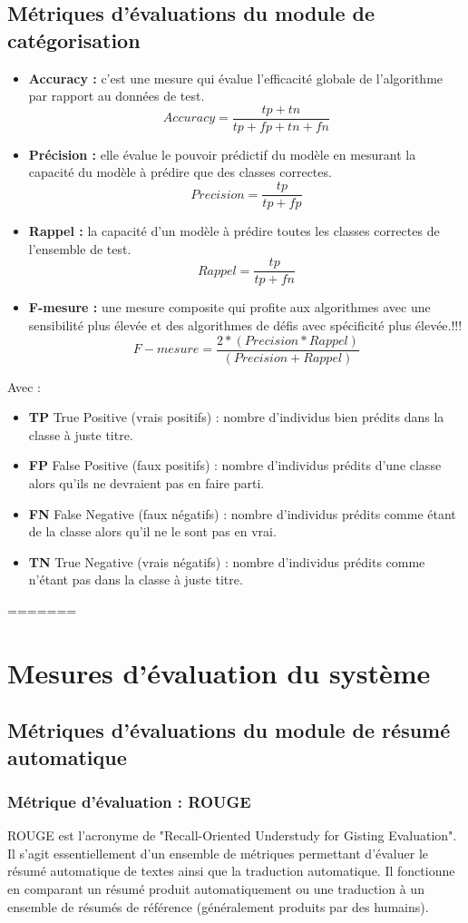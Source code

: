\subsection{Métriques d'évaluations du module de catégorisation}
\begin{itemize}
    \item{\textbf{Accuracy :} }c'est une mesure qui évalue l'efficacité globale de l'algorithme par rapport au données de test.
    \[ Accuracy = \frac{tp+tn} {tp+fp+tn+fn} \]
    \item{\textbf{Précision :} }elle évalue le pouvoir prédictif du modèle en mesurant la capacité du modèle à prédire que des classes correctes.
    \[ Precision = \frac{tp} {tp+fp} \]
    \item{\textbf{Rappel :} }la capacité d'un modèle à prédire toutes les classes correctes de l'ensemble de test.
    \[ Rappel = \frac{tp} {tp+fn} \]
    \item{\textbf{F-mesure :} }une mesure composite qui profite aux algorithmes avec une sensibilité plus élevée et des algorithmes de défis avec spécificité plus élevée.!!!
    \[ F-mesure = \frac{2 * (Precision * Rappel)} {(Precision + Rappel)} \]
\end{itemize}
Avec :
\begin{itemize}
    \item{\textbf{TP }True Positive (vrais positifs) :} nombre d'individus bien prédits dans la classe à juste titre.
    \item{\textbf{FP }False Positive (faux positifs) :} nombre d'individus prédits d'une classe alors qu'ils ne devraient pas en faire parti.
    \item{\textbf{FN }False Negative (faux négatifs) :} nombre d'individus prédits comme étant de la classe alors qu'il ne le sont pas en vrai.
    \item{\textbf{TN }True Negative (vrais négatifs) :} nombre d'individus prédits comme n'étant pas dans la classe à juste titre.
\end{itemize}
=======
\section{Mesures d'évaluation du système}
    \subsection{Métriques d'évaluations du module de résumé automatique}
        \subsubsection{Métrique d'évaluation : ROUGE\label{metrique-eval}}
        ROUGE est l'acronyme de "Recall-Oriented Understudy for Gisting Evaluation". Il s'agit essentiellement d'un ensemble de métriques permettant d'évaluer le résumé automatique de textes ainsi que la traduction automatique. Il fonctionne en comparant un résumé produit automatiquement ou une traduction à un ensemble de résumés de référence (généralement produits par des humains). \cite{rouge0}

